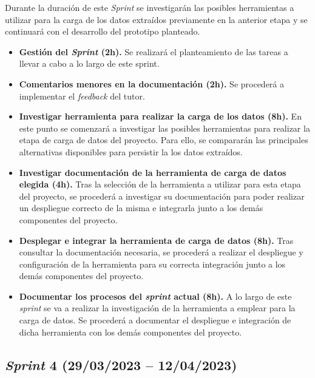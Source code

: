 Durante la duración de este \textit{Sprint} se investigarán las posibles herramientas a utilizar para la carga de los datos extraídos previamente en la anterior etapa y se continuará con el desarrollo del prototipo planteado.

\begin{itemize}

    \item \textbf{Gestión del \textit{Sprint} (2h).} Se realizará el planteamiento de las tareas a llevar a cabo a lo largo de este sprint.

    \item \textbf{Comentarios menores en la documentación (2h).} Se procederá a implementar el \textit{feedback} del tutor.

    \item \textbf{Investigar herramienta para realizar la carga de los datos (8h).} En este punto se comenzará a investigar las posibles herramientas para realizar la etapa de carga de datos del proyecto. Para ello, se compararán las principales alternativas disponibles para persistir la los datos extraídos.

    \item \textbf{Investigar documentación de la herramienta de carga de datos elegida (4h).} Tras la selección de la herramienta a utilizar para esta etapa del proyecto, se procederá a investigar su documentación para poder realizar un despliegue correcto de la misma e integrarla junto a los demás componentes del proyecto.

    \item \textbf{Desplegar e integrar la herramienta de carga de datos (8h).} Tras consultar la documentación necesaria, se procederá a realizar el despliegue y configuración de la herramienta para su correcta integración junto a los demás componentes del proyecto.

    \item \textbf{Documentar los procesos del \textit{sprint} actual (8h).} A lo largo de este \textit{sprint} se va a realizar la investigación de la herramienta a emplear para la carga de datos. Se procederá a documentar el despliegue e integración de dicha herramienta con los demás componentes del proyecto.

\end{itemize}

\subsection{\textit{Sprint} 4 (29/03/2023 -- 12/04/2023)}

